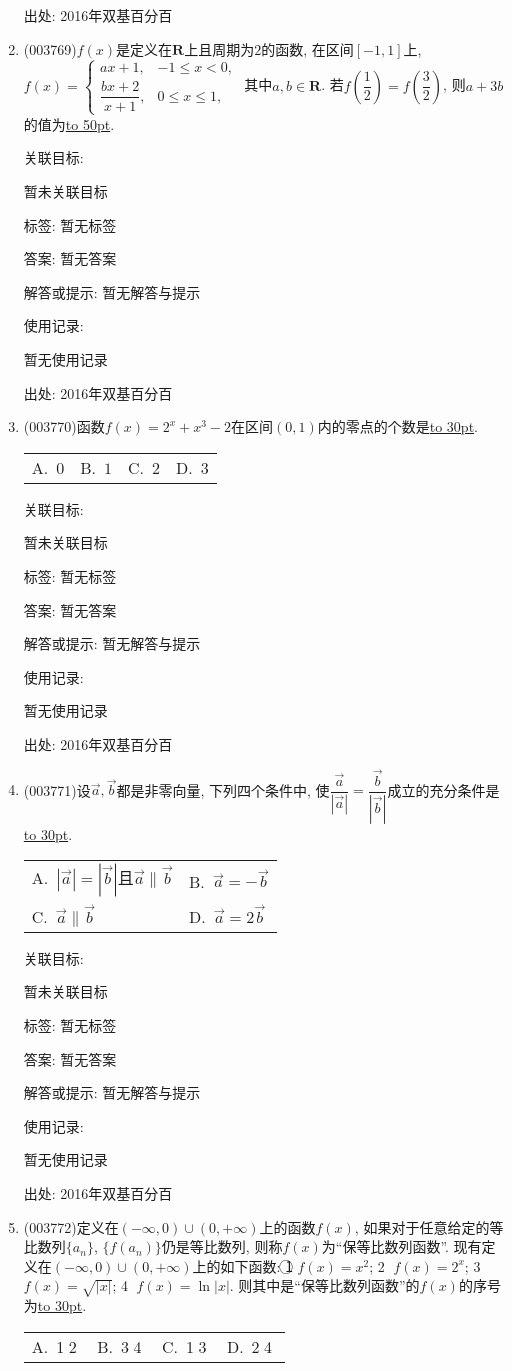 \documentclass[10pt,a4paper]{article}
\newcommand{\blank}[1]{\underline{\hbox to #1pt{}}}
\newcommand{\twoch}[4]{\par\begin{tabular}{p{.46\textwidth}p{.46\textwidth}}
A.~#1& B.~#2\\
C.~#3& D.~#4
\end{tabular}}
\newcommand{\fourch}[4]{\par\begin{tabular}{p{.23\textwidth}p{.23\textwidth}p{.23\textwidth}p{.23\textwidth}}
A.~#1 &B.~#2& C.~#3& D.~#4
\end{tabular}}
\begin{document}
\begin{enumerate}[1.]
出处: 2016年双基百分百
\item { (003769)}$f(x)$是定义在$\mathbf{R}$上且周期为$2$的函数, 在区间$[-1,1]$上, $f(x)=\begin{cases}ax+1, & -1\le x<0,\\\dfrac{bx+2}{x+1}, & 0\le x\le 1,\end{cases}$ 其中$a,b\in \mathbf{R}$. 若$f\left(\dfrac 12\right)=f\left(\dfrac 32\right)$, 则$a+3b$的值为\blank{50}.


关联目标:

暂未关联目标



标签: 暂无标签

答案: 暂无答案

解答或提示: 暂无解答与提示

使用记录:

暂无使用记录


出处: 2016年双基百分百
\item { (003770)}函数$f(x)=2^x+x^3-2$在区间$(0,1)$内的零点的个数是\blank{30}.
\fourch{$0$}{$1$}{$2$}{$3$}


关联目标:

暂未关联目标



标签: 暂无标签

答案: 暂无答案

解答或提示: 暂无解答与提示

使用记录:

暂无使用记录


出处: 2016年双基百分百
\item { (003771)}设$\overrightarrow{a},\overrightarrow{b}$都是非零向量, 下列四个条件中, 使$\dfrac{\overrightarrow{a}}{|\overrightarrow{a}|}=\dfrac{\overrightarrow{b}}{|\overrightarrow{b}|}$成立的充分条件是\blank{30}.
\twoch{$|\overrightarrow{a}|=|\overrightarrow{b}|$且$\overrightarrow{a}\parallel \overrightarrow{b}$}{$\overrightarrow{a}=-\overrightarrow{b}$}{$\overrightarrow{a}\parallel\overrightarrow{b}$}{$\overrightarrow{a}=2\overrightarrow{b}$}


关联目标:

暂未关联目标



标签: 暂无标签

答案: 暂无答案

解答或提示: 暂无解答与提示

使用记录:

暂无使用记录


出处: 2016年双基百分百
\item { (003772)}定义在$(-\infty,0)\cup (0,+\infty)$上的函数$f(x)$, 如果对于任意给定的等比数列$\{a_n\}$, $\{f(a_n)\}$仍是等比数列, 则称$f(x)$为``保等比数列函数''. 现有定义在$(-\infty,0)\cup (0,+\infty)$上的如下函数: \textcircled{1} $f(x)=x^2$; \textcircled{2} $f(x)=2^x$; \textcircled{3} $f(x)=\sqrt{|x|}$; \textcircled{4} $f(x)=\ln|x|$. 则其中是``保等比数列函数''的$f(x)$的序号为\blank{30}.
\fourch{\textcircled{1}\textcircled{2}}{\textcircled{3}\textcircled{4}}{\textcircled{1}\textcircled{3}}{\textcircled{2}\textcircled{4}}



\end{enumerate}
\end{document}
